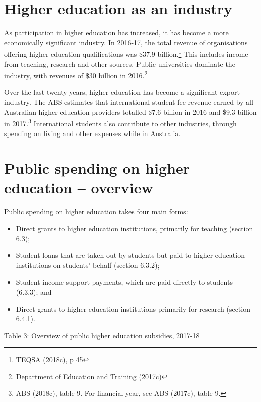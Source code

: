 \documentclass[]{book}
\begin{document}
\hypertarget{higher-education-as-an-industry}{%
\section{Higher education as an industry}\label{higher-education-as-an-industry}}

As participation in higher education has increased, it has become a more economically significant industry. In 2016-17, the total revenue of organisations offering higher education qualifications was \$37.9 billion.\footnote{TEQSA (2018c), p 45} This includes income from teaching, research and other sources. Public universities dominate the industry, with revenues of \$30 billion in 2016.\footnote{Department of Education and Training (2017c)}

Over the last twenty years, higher education has become a significant export industry. The ABS estimates that international student fee revenue earned by all Australian higher education providers totalled \$7.6 billion in 2016 and \$9.3 billion in 2017.\footnote{ABS (2018c), table 9. For financial year, see ABS (2017c), table 9.} International students also contribute to other industries, through spending on living and other expenses while in Australia.

\hypertarget{public-spending-on-higher-education-overview}{%
\section{Public spending on higher education -- overview}\label{public-spending-on-higher-education-overview}}

Public spending on higher education takes four main forms:

\begin{itemize}
\item
  Direct grants to higher education institutions, primarily for teaching (section 6.3);
\item
  Student loans that are taken out by students but paid to higher education institutions on students' behalf (section 6.3.2);
\item
  Student income support payments, which are paid directly to students (6.3.3); and
\item
  Direct grants to higher education institutions primarily for research (section 6.4.1).
\end{itemize}

\protect\hypertarget{_Ref313977905}{}{}Table 3: Overview of public higher education subsidies, 2017-18
\end{document}

